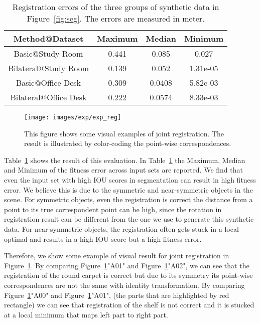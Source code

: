 \begin{table}
	\centering
	\caption{Registration errors of the three groups of synthetic data in Figure~\ref{fig:seg}. The errors are measured in meter.}
	\begin{tabular}{c | c c c}
		Method@Dataset&Maximum&Median&Minimum\\
		\hline 
		Basic@Study Room&0.441&0.085&0.027\\
		Bilateral@Study Room&0.139&0.052&1.31e-05\\
	    Basic@Office Desk&0.309&0.0408&5.82e-03\\
		Bilateral@Office Desk&0.222&0.0574&8.33e-03\\
	\end{tabular}
	\label{tab:regerror}
\end{table}
\begin{figure}[htb]
	\centering
	\texttt{[image: images/exp/exp\_reg]}
	\caption{This figure shows some visual examples of joint registration.  The result  is illustrated by color-coding the point-wise correspondences. }
	\label{fig:reg_colorcode}
\end{figure}
Table~\ref{tab:regerror} shows the result of this evaluation. In Table~\ref{tab:regerror} the Maximum, Median and Minimum of the fitness error across input sets are reported.
%
We find that even the input set with high IOU scores in segmentation can result in high fitness error. We believe this is due to the symmetric and near-symmetric objects in the scene. For symmetric objects, even the registration is correct the distance from a point to its true correspondent point can be high, since the rotation in registration result can be different from the one we use to generate this synthetic data. For near-symmetric objects, the registration often gets stuck in a local optimal and results in a high IOU score but a high fitness error. 

Therefore, we show some example of visual result for joint registration in Figure~\ref{fig:reg_colorcode}. By comparing Figure~\ref{fig:reg_colorcode}"A01" and Figure~\ref{fig:reg_colorcode}"A02", we can see that the registration of the round carpet is correct but due to its symmetry its point-wise correspondences are not the same with identity transformation.
By comparing Figure~\ref{fig:reg_colorcode}"A00" and Figure~\ref{fig:reg_colorcode}"A01", (the parts that are highlighted by red rectangle) we can see that registration of the shelf is not correct and it is stucked at a local minimum that maps left part to right part.

